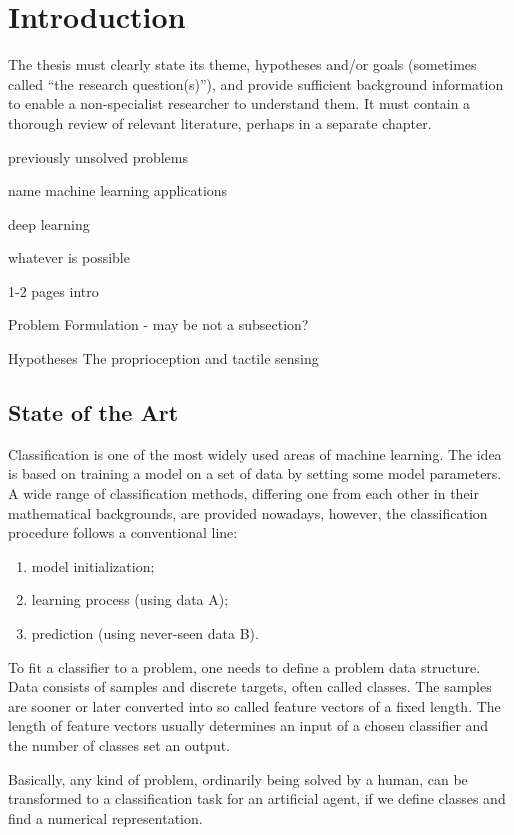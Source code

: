\chapter{Introduction} \label{chap:introduction}

The thesis must clearly state its theme, hypotheses and/or goals (sometimes called “the research question(s)”), and provide sufficient background information to enable a non-specialist researcher to understand them. It must contain a thorough review of relevant literature, perhaps in a separate chapter.

previously unsolved problems

name machine learning applications

deep learning

whatever is possible

1-2 pages intro

Problem Formulation
- may be not a subsection?

Hypotheses
The proprioception and tactile sensing

\newpage
\section{State of the Art} \label{sec:soa}
Classification is one of the most widely used areas of machine learning. The idea is based on training a model on a set of data by setting some model parameters. A wide range of classification methods, differing one from each other in their mathematical backgrounds, are provided nowadays, however, the classification procedure follows a conventional line:

\begin{enumerate}
\item model initialization;
\item learning process (using data A);
\item prediction (using never-seen data B).
\end{enumerate}

To fit a classifier to a problem, one needs to define a problem data structure. Data consists of samples and discrete targets, often called classes. The samples are sooner or later converted into so called feature vectors of a fixed length. The length of feature vectors usually determines an input of a chosen classifier and the number of classes set an output.

Basically, any kind of problem, ordinarily being solved by a human, can be transformed to a classification task for an artificial agent, if we define classes and find a numerical representation.

